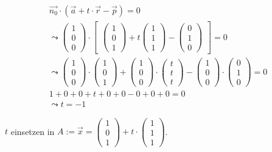 \begin{gather}
\vec{n_0} \cdot (\vec{a}+t\cdot \vec{r}-\vec{p})=0\\
\leadsto 
\begin{pmatrix}
1\\0\\0
\end{pmatrix} \cdot 
\begin{bmatrix}
\begin{pmatrix}
1\\0\\1
\end{pmatrix}
+ t
\begin{pmatrix}
1\\1\\1
\end{pmatrix}
-
\begin{pmatrix}
0\\1\\0
\end{pmatrix}
\end{bmatrix} = 0\\
\leadsto
\begin{pmatrix}
1\\0\\0
\end{pmatrix}\cdot
\begin{pmatrix}
1\\0\\1
\end{pmatrix}
+
\begin{pmatrix}
1\\0\\0
\end{pmatrix}
\cdot
\begin{pmatrix}
t\\t\\t
\end{pmatrix}
-
\begin{pmatrix}
1\\0\\0
\end{pmatrix}
\cdot
\begin{pmatrix}
0\\1\\0
\end{pmatrix} =0\\
1+0+0+t+0+0-0+0+0=0\\
\leadsto t=-1
\end{gather}

\ensuremath{t} einsetzen in \ensuremath{A:= \vec{x}=\begin{pmatrix}
		1\\0\\1
	\end{pmatrix} +t\cdot\begin{pmatrix}
		1\\1\\1
\end{pmatrix}}.\\

